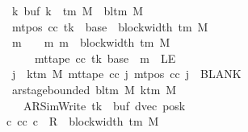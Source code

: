 \begin{isabellebody}
\ \ \ \ \ \ \ \ \ \ \ \ \ \ \ \ \ {\isasymforall}k{\isachardot}{\kern0pt}\ buf\ k\ {\isasymin}\ {\isasymGamma}{\isacharunderscore}{\kern0pt}tm\ M\ {\isasymunion}\ {\isacharbraceleft}{\kern0pt}bl{\isacharunderscore}{\kern0pt}tm\ M{\isacharbraceright}{\kern0pt}{\isacharsemicolon}{\kern0pt}\isanewline
\ \ \ \ \ \ \ \ \ \ \ \ \ \ \ \ \ mt{\isacharunderscore}{\kern0pt}pos\ cc\ tk\ {\isacharequal}{\kern0pt}\ base\ {\isacharplus}{\kern0pt}\ block{\isacharunderscore}{\kern0pt}width\ {\isacharparenleft}{\kern0pt}{\isasymGamma}{\isacharunderscore}{\kern0pt}tm\ M{\isacharparenright}{\kern0pt}{\isacharsemicolon}{\kern0pt}\isanewline
\ \ \ \ \ \ \ \ \ \ \ \ \ \ \ \ \ {\isasymAnd}m{\isachardot}{\kern0pt}\ {\isasymlbrakk}\ {}\ {\isasymle}\ m{\isacharsemicolon}{\kern0pt}\ m\ {\isasymle}\ block{\isacharunderscore}{\kern0pt}width\ {\isacharparenleft}{\kern0pt}{\isasymGamma}{\isacharunderscore}{\kern0pt}tm\ M{\isacharparenright}{\kern0pt}\ {\isasymrbrakk}\isanewline
\ \ \ \ \ \ \ \ \ \ \ \ \ \ \ \ \ \ \ \ {\isasymLongrightarrow}\ mt{\isacharunderscore}{\kern0pt}tape\ cc\ tk\ {\isacharparenleft}{\kern0pt}base\ {\isacharplus}{\kern0pt}\ m{\isacharparenright}{\kern0pt}\ {\isasymnoteq}\ LE{}{\isacharsemicolon}{\kern0pt}\isanewline
\ \ \ \ \ \ \ \ \ \ \ \ \ \ \ \ \ {\isasymforall}j\ {\isasymge}\ k{\isacharunderscore}{\kern0pt}tm\ M{\isachardot}{\kern0pt}\ mt{\isacharunderscore}{\kern0pt}tape\ cc\ j\ {\isacharparenleft}{\kern0pt}mt{\isacharunderscore}{\kern0pt}pos\ cc\ j{\isacharparenright}{\kern0pt}\ {\isacharequal}{\kern0pt}\ BLANK{}{\isacharsemicolon}{\kern0pt}\isanewline
\ \ \ \ \ \ \ \ \ \ \ \ \ \ \ \ \ ar{\isacharunderscore}{\kern0pt}stage{\isacharunderscore}{\kern0pt}bounded\ {\isacharparenleft}{\kern0pt}bl{\isacharunderscore}{\kern0pt}tm\ M{\isacharparenright}{\kern0pt}\ {\isacharparenleft}{\kern0pt}k{\isacharunderscore}{\kern0pt}tm\ M{\isacharparenright}{\kern0pt}\isanewline
\ \ \ \ \ \ \ \ \ \ \ \ \ \ \ \ \ \ \ {\isacharparenleft}{\kern0pt}AR{\isacharunderscore}{\kern0pt}SimWrite{\isacharcomma}{\kern0pt}\ tk{\isacharcomma}{\kern0pt}\ {}{\isacharcomma}{\kern0pt}\ buf{\isacharcomma}{\kern0pt}\ dvec{\isacharcomma}{\kern0pt}\ posk{\isacharparenright}{\kern0pt}\ {\isasymrbrakk}\isanewline
\ \ \ \ \ \ \ \ \ \ \ \ \ \ \ {\isasymLongrightarrow}\ {\isasymexists}c{}{\isachardot}{\kern0pt}\ {\isacharparenleft}{\kern0pt}cc{\isacharcomma}{\kern0pt}\ c{}{\isacharparenright}{\kern0pt}\ {\isasymin}\ R{\isacharprime}{\kern0pt}\ {\isacharcircum}{\kern0pt}{\isacharcircum}{\kern0pt}\ block{\isacharunderscore}{\kern0pt}width\ {\isacharparenleft}{\kern0pt}{\isasymGamma}{\isacharunderscore}{\kern0pt}tm\ M{\isacharparenright}{\kern0pt}\isanewline

\end{isabellebody}
